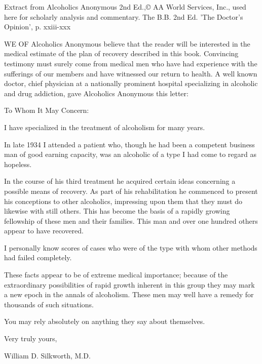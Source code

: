 
Extract from Alcoholics Anonymous 2nd Ed.,© AA World Services, Inc., 
    used here for scholarly analysis and commentary.
The B.B. 2nd Ed. 'The Doctor's Opinion', p. xxiii-xxx


\begin{biblechapter}
    WE OF Alcoholics Anonymous believe that the reader will be interested in the medical estimate 
        of the plan of recovery described in this book. 
\verse Convincing testimony must surely come from medical men who have had experience with the sufferings of our members and have witnessed our return to health. 
\verse A well known doctor, chief physician at a nationally prominent hospital specializing in alcoholic and drug addiction, gave Alcoholics Anonymous this letter:
\end{biblechapter}


\begin{biblechapter}
    To Whom It May Concern:

\verse I have specialized in the treatment of alcoholism for many years.

\verse In late 1934 I attended a patient who, 
    though he had been a competent business man of good earning capacity, 
    was an alcoholic of a type I had come to regard as hopeless.

\verse In the course of his third treatment he acquired certain ideas concerning a possible means of recovery. 
\verse As part of his rehabilitation he commenced to present his conceptions to other alcoholics, 
    impressing upon them that they must do likewise with still others. 
\verse This has become the basis of a rapidly growing fellowship of these men and their families. 
\verse This man and over one hundred others appear to have recovered.

\verse I personally know scores of cases who were of the type with whom other methods had failed completely.

\verse These facts appear to be of extreme medical importance; 
    because of the extraordinary possibilities of rapid growth inherent in this group 
    they may mark a new epoch in the annals of alcoholism. 
\verse These men may well have a remedy for thousands of such situations.

\verse You may rely absolutely on anything they say about themselves.

\verse Very truly yours, 

William D. Silkworth, M.D.
\end{biblechapter}


